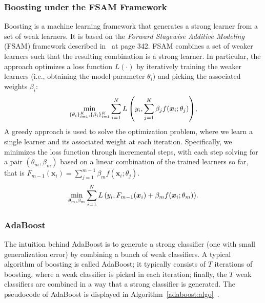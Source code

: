 {    \subsubsection{Boosting under the FSAM Framework}\label{sec:boosting-trees}
    Boosting is a machine learning framework that generates a strong learner  from a set of weak learners. 
    It is based on the \textit{Forward Stagewise Additive Modeling} (FSAM) framework described in~\cite{hastie2009elements} at page 342. 
    FSAM combines a set of weaker learners such that the resulting combination is a strong learner. 
    In particular, the approach optimizes a loss function $L(\cdot)$  by iteratively training the weaker learners (i.e., obtaining the model parameter $\theta_i$) and picking the associated weights $\beta_i$:
            \begin{equation}
                \min_{\{ \theta_i \}_{i=1}^{K}, \{ \beta_i \}_{i=1}^{K} } \sum_{i=1}^{N}{L\left( y_i, \sum_{j=1}^{K}{\beta_j f(\bm{x}_i; \theta_j)} \right)},
            \end{equation}
        A greedy approach is used to solve the optimization problem, where we learn a single learner and its associated weight  at each iteration. 
        Specifically, we minimizes the loss function through  incremental steps,  with each step solving for a pair $(\theta_m, \beta_m)$ based on a linear combination of the trained learners so far, that is $F_{m-1}(\bm{x}_i) = \sum_{j=1}^{m-1}{\beta_m f(\bm{x}_i; \theta_j)}$.
            \begin{equation}\label{eq:forward-stagewise-add-model}
                \min_{\theta_m, \beta_m} \sum_{i=1}^{N}{
                    L\left( y_i, F_{m-1}(\bm{x}_i) + \beta_m f(\bm{x}_i; \theta_m) \right)
                }.
            \end{equation}
    
        
        

        
\subsubsection{AdaBoost}
The intuition behind AdaBoost is to generate a strong classifier (one with small generalization error) by combining a bunch of weak classifiers. 
A typical algorithm of boosting is called AdaBoost; it typically consists of $T$ iterations of boosting, where a weak classifier is picked in each iteration; finally, the $T$ weak classifiers are combined in a way that a strong classifier is generated. 
The pseudocode of AdaBoost is displayed in Algorithm~\ref{adaboost:algo}~\cite{mohri2018foundations}.

}
